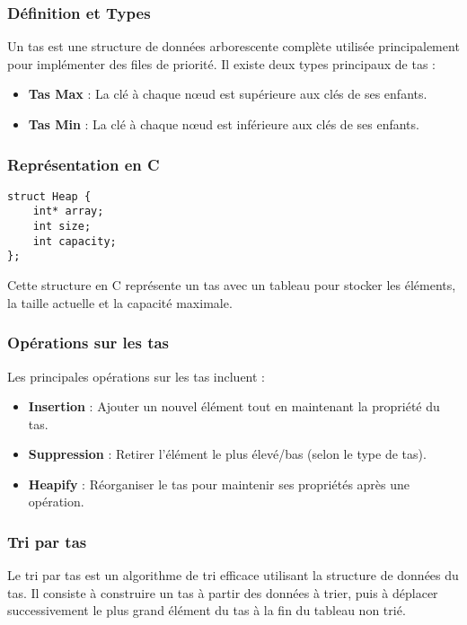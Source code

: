 \subsubsection{Définition et Types}
Un tas est une structure de données arborescente complète utilisée principalement pour implémenter des files de priorité.
Il existe deux types principaux de tas :
\begin{itemize}
    \item \textbf{Tas Max} : La clé à chaque nœud est supérieure aux clés de ses enfants.
    \item \textbf{Tas Min} : La clé à chaque nœud est inférieure aux clés de ses enfants.
\end{itemize}

\subsubsection{Représentation en C}
\begin{lstlisting}[label={lst:imp_heap}]
struct Heap {
    int* array;
    int size;
    int capacity;
};
\end{lstlisting}
Cette structure en C représente un tas avec un tableau pour stocker les éléments, la taille actuelle et la capacité maximale.

\subsubsection{Opérations sur les tas}
Les principales opérations sur les tas incluent :
\begin{itemize}
    \item \textbf{Insertion} : Ajouter un nouvel élément tout en maintenant la propriété du tas.
    \item \textbf{Suppression} : Retirer l'élément le plus élevé/bas (selon le type de tas).
    \item \textbf{Heapify} : Réorganiser le tas pour maintenir ses propriétés après une opération.
\end{itemize}

\subsubsection{Tri par tas}
Le tri par tas est un algorithme de tri efficace utilisant la structure de données du tas.
Il consiste à construire un tas à partir des données à trier, puis à déplacer successivement le plus grand élément du tas à la fin du tableau non trié.

